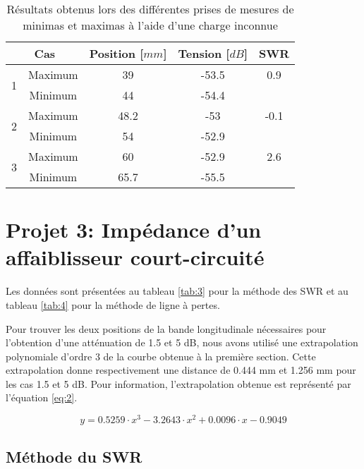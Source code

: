 \begin{table}[htbp]
    \centering
    \begin{tabular}{|c|c||c|c|c|} \hline
       \multicolumn{2}{|c||}{Cas}  & Position [$mm$] & Tension [$dB$] & SWR\\ \hline \hline
\multirow{2}{*}{1} & Maximum & 39 & -53.5 & 0.9\\ 
 & Minimum & 44 & -54.4 & \\ \hline
\multirow{2}{*}{2} & Maximum & 48.2 & -53 & -0.1\\ 
 & Minimum & 54 & -52.9 & \\ \hline
\multirow{2}{*}{3} & Maximum & 60 & -52.9 & 2.6\\ 
 & Minimum & 65.7 & -55.5 & \\ \hline
    \end{tabular}%
        \caption{Résultats obtenus lors des différentes prises de mesures de minimas et maximas à l'aide d'une charge inconnue}
    \label{tab:tabnum2.2}%
\end{table}%

\section{Projet 3: Impédance d'un affaiblisseur court-circuité}
Les données sont présentées au tableau \ref{tab:3} pour la méthode des SWR et au tableau \ref{tab:4} pour la méthode de ligne à pertes.

Pour trouver les deux positions de la bande longitudinale nécessaires pour l'obtention d'une atténuation de 1.5 et 5 dB, nous avons utilisé une extrapolation polynomiale d'ordre 3 de la courbe obtenue à la première section. Cette extrapolation donne respectivement une distance de 0.444 mm et 1.256 mm pour les cas 1.5 et 5 dB. Pour information, l'extrapolation obtenue est représenté par l'équation \ref{eq:2}.

\begin{equation}
\label{eq:2}
    y = 0.5259\cdot x^3 - 3.2643\cdot x^2 + 0.0096\cdot x - 0.9049
\end{equation}
\subsection{Méthode du SWR}

